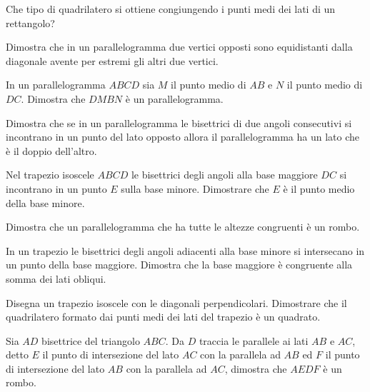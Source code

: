 \begin{multicols}{2}
\begin{esercizio}
\label{ese:4.51}
Che tipo di quadrilatero si ottiene congiungendo i punti medi dei 
lati di un rettangolo?
\end{esercizio}

\begin{esercizio}
\label{ese:4.52}
Dimostra che in un parallelogramma due vertici opposti sono 
equidistanti dalla diagonale avente per estremi gli altri due vertici.
\end{esercizio}

\begin{esercizio}
\label{ese:4.53}
In un parallelogramma $ABCD$ sia $M$ il punto medio di $AB$ e $N$ il 
punto medio di $DC$. Dimostra che $DMBN$ è un parallelogramma.
\end{esercizio}

\begin{esercizio}
\label{ese:4.54}
Dimostra che se in un parallelogramma le bisettrici di due angoli 
consecutivi si incontrano in un punto del lato opposto allora il 
parallelogramma ha un lato che è il doppio dell'altro.
\end{esercizio}

\begin{esercizio}
\label{ese:4.55}
Nel trapezio isoscele $ABCD$ le bisettrici degli angoli alla base 
maggiore $DC$ si incontrano in un punto $E$ sulla base minore. 
Dimostrare che $E$ è il punto medio della base minore.
\end{esercizio}

\begin{esercizio}
\label{ese:4.56}
Dimostra che un parallelogramma che ha tutte le altezze congruenti è 
un rombo.
\end{esercizio}

\begin{esercizio}
\label{ese:4.57}
In un trapezio le bisettrici degli angoli adiacenti alla base minore 
si intersecano in un punto della base maggiore. Dimostra che la base 
maggiore è congruente alla somma dei lati obliqui.
\end{esercizio}

\begin{esercizio}
\label{ese:4.58}
Disegna un trapezio isoscele con le diagonali perpendicolari. 
Dimostrare che il quadrilatero formato dai punti medi dei lati del 
trapezio è un quadrato.
\end{esercizio}

\begin{esercizio}
\label{ese:4.59}
Sia $AD$ bisettrice del triangolo $ABC$. Da $D$ traccia le parallele 
ai lati $AB$ e $AC$, detto $E$ il punto di intersezione del lato $AC$ 
con la parallela ad $AB$ ed $F$ il punto di intersezione del lato 
$AB$ con la parallela ad $AC$, dimostra che $AEDF$ è un rombo.
\end{esercizio}

\end{multicols}

